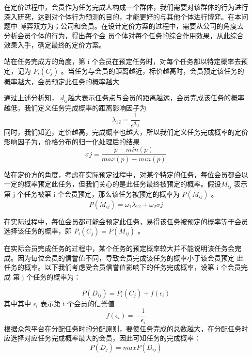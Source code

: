 \documentclass{cumcmthesis}
\begin{document}
在定价过程中，会员作为任务完成人构成一个群体，我们需要对该群体的行为进行 深入研究，达到对个体行为预测的目的，才能更好的与其他个体进行博弈。在本问题中 博弈双方为；公司和会员。在设计定价方案的过程中，需要从公司的角度去分析会员个体的行为，得出每个会 员个体对每个任务的综合作用效果，从此综合效果入手，确定最终的定价方案。

站在任务完成方的角度，第 i 个会员在预定任务时，对每个任务都以特定概率去预 定，记为 $P_i(C_j)$ 。当任务与会员的距离越近，标价越高时，会员预定该任务的概率越大，会员预定此任务的概率越大

通过上述分析知， $d_{ij}$越大表示任务点与会员的距离越远，会员完成该任务的概率越低，我们定义任务完成概率的距离影响因子为
\begin{equation}
\left.
\lambda_{12}=\frac{1}{e^{d_{ij}}}
\right.
\end{equation} 
同时，我们知道，定价越高，完成概率也越大，所以我们定义任务完成概率的定价影响因子为，价格分布的归一化处理后的结果
\begin{equation}
\left.
\sigma{j}=\frac{p-min(p)}{max(p)-min(p)}
\right.
\end{equation} 

站在定价方的角度，考虑在实际预定过程中，对某个特定的任务，每位会员都会以 一定的概率预定此任务，但我们关心的是此任务最终被预定的概率。假设$M_{ij}$ 表示第 j 个任务被第 i 个会员预定，那么该任务被预定的概率为 $P(M_{ij})$ 。
\begin{equation}
\left.
P(M_{ij})=\omega_1\lambda_{12}+\omega_2\sigma{j}
\right.
\end{equation}




在实际过程中，每位会员都可能会预定此任务，易得该任务被预定的概率等于会员 选择该任务的概率，即 $P_i(C_j)=P(M_{ij})$ 。

在实际会员完成任务的过程中，某个任务的预定概率较大并不能说明该任务会完成。因为每位会员的信誉值不同，导致会员完成该任务的概率小于该会员预定 此任务的概率。以下我们考虑受会员信誉值影响下的任务完成概率，设第 i 个会员完成 第 j 个任务的概率为： 

\begin{equation}
\left.
P\left( D_{ij}  \right)=P_i(C_j)+ f\left(\epsilon_i\right)
\right.
\end{equation}
其中其中 $\epsilon_i$ 表示第 i 个会员的信誉值
\begin{equation}
\left.f\left(\epsilon_i\right)=-\frac{1}{\epsilon_i}
\right.
\end{equation}
根据众包平台在分配任务时的分配原则，要使任务完成的总数越大，在分配任务时 应选择对应任务完成概率最大的会员，因此可知任务的完成概率：
\begin{equation}
\left.
P\left( D_{j}  \right)=max P\left( D_{ij} \right)
\right.
\end{equation}
\end{document}
